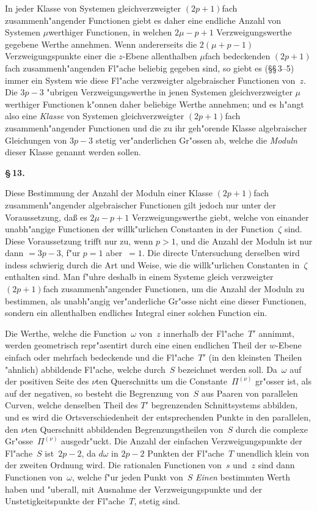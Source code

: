 \documentclass[12pt,a4paper]{book}
\theoremstyle{definition}
\theoremstyle{remark}
\begin{document}
In jeder Klasse von Systemen gleichverzweigter $(2p+1)$fach
zusammenh"angender Functionen giebt es daher eine endliche Anzahl von
Systemen $\mu$werthiger Functionen, in welchen $2\mu - p + 1$
Verzweigungswerthe gegebene Werthe annehmen. Wenn andererseits die
$2(\mu + p - 1)$ Verzweigungspunkte einer die $z$-Ebene allenthalben
$\mu$fach bedeckenden $(2p+1)$fach zusammenh"angenden Fl"ache beliebig
gegeben sind, so giebt es (\S\S\,3--5) immer ein System wie diese Fl"ache
verzweigter algebraischer Functionen von~$z$. Die $3p - 3$ "ubrigen
Verzweigungswerthe in jenen Systemen gleichverzweigter $\mu$werthiger
Functionen k"onnen daher beliebige Werthe annehmen; und es h"angt also
eine \emph{Klasse} von Systemen gleichverzweigter $(2p+1)$fach zusammenh"angender
Functionen und die zu ihr geh"orende Klasse algebraischer Gleichungen
von $3p - 3$ stetig ver"anderlichen Gr"ossen ab, welche die \emph{Moduln}
dieser Klasse genannt werden sollen.

\medskip
\textbf{\S\,13.}

Diese Bestimmung der Anzahl der Moduln einer Klasse $(2p+1)$fach
zusammenh"angender algebraischer Functionen gilt jedoch nur unter der
Voraussetzung, da\ss{} es $2\mu - p + 1$ Verzweigungswerthe giebt, welche von
einander unabh"angige Functionen der willk"urlichen Constanten in der
Function~$\zeta$ sind. Diese Voraussetzung trifft nur zu, wenn $p > 1$, und
die Anzahl der Moduln ist nur dann $= 3p - 3$, f"ur $p = 1$ aber~$= 1$.
Die directe Untersuchung derselben wird indess schwierig durch die Art und
Weise, wie die willk"urlichen Constanten in~$\zeta$ enthalten sind. Man f"uhre
deshalb in einem Systeme gleich verzweigter $(2p+1)$fach zusammenh"angender
Functionen, um die Anzahl der Moduln zu bestimmen, als unabh"angig
ver"anderliche Gr"osse nicht eine dieser Functionen, sondern ein allenthalben
endliches Integral einer solchen Function ein.

Die Werthe, welche die Function~$\omega$ von~$z$ innerhalb der Fl"ache~$T'$
annimmt, werden geometrisch repr"asentirt durch eine einen endlichen Theil
der $w$-Ebene einfach oder mehrfach bedeckende und die Fl"ache~$T'$ (in
den kleinsten Theilen "ahnlich) abbildende Fl"ache, welche durch~$S$
bezeichnet werden soll. Da~$\omega$ auf der positiven Seite des $\nu$ten
Querschnitts um die Constante~$\Pi^{(\nu)}$ gr"osser ist, als auf der negativen,
so besteht die Begrenzung von~$S$ aus Paaren von parallelen Curven,
welche denselben Theil des $T'$ begrenzenden Schnittsystems abbilden, und
es wird die Ortsverschiedenheit der entsprechenden Punkte in den parallelen,
den $\nu$ten Querschnitt abbildenden Begrenzungstheilen von~$S$ durch die
complexe Gr"osse~$\Pi^{(\nu)}$ ausgedr"uckt. Die Anzahl der einfachen
Verzweigungspunkte der Fl"ache~$S$ ist~$2p - 2$, da $d\omega$ in $2p - 2$
Punkten der Fl"ache~$T$ unendlich klein von der zweiten Ordnung wird.
Die rationalen Functionen von~$s$ und~$z$ sind dann Functionen von~$\omega$,
welche f"ur jeden Punkt von~$S$ \emph{Einen} bestimmten Werth haben und
"uberall, mit Ausnahme der Verzweigungspunkte und der Unstetigkeitspunkte
der Fl"ache~$T$, stetig sind.
\end{document}

